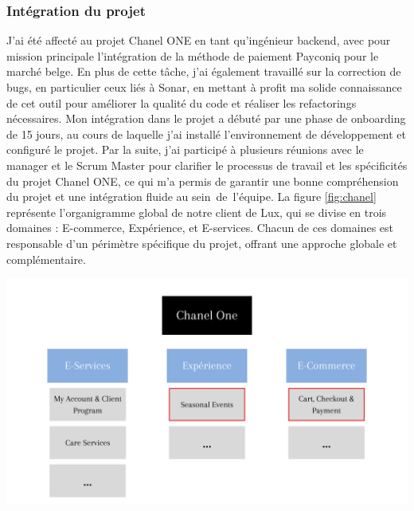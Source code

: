 \subsubsection{Intégration du projet}

J'ai été affecté au projet Chanel ONE en tant qu'ingénieur backend, avec pour mission principale l'intégration de la méthode de paiement Payconiq pour le marché belge. En plus de cette tâche, j'ai également travaillé sur la correction de bugs, en particulier ceux liés à Sonar, en mettant à profit ma solide connaissance de cet outil pour améliorer la qualité du code et réaliser les refactorings nécessaires. Mon intégration dans le projet a débuté par une phase de onboarding de 15 jours, au cours de laquelle j'ai installé l'environnement de développement et configuré le projet. Par la suite, j'ai participé à plusieurs réunions avec le manager et le Scrum Master pour clarifier le processus de travail et les spécificités du projet Chanel ONE, ce qui m'a permis de garantir une bonne compréhension du projet et une intégration fluide au sein de l'équipe.
La figure \ref{fig:chanel} représente l'organigramme global de notre client de Lux, qui se divise en trois domaines : E-commerce, Expérience, et E-services. Chacun de ces domaines est responsable d'un périmètre spécifique du projet, offrant une approche globale et complémentaire.
\begin{center}
    \centering
    \includegraphics[width=19cm]{Figures/chanelOne.png}
    \label{fig:chanel}
\end{center}
